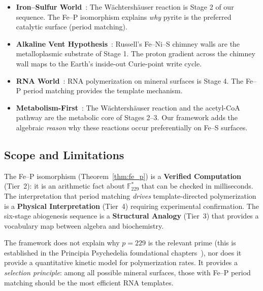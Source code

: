 \documentclass[12pt]{article}
\theoremstyle{principia}
\theoremstyle{definition}
\theoremstyle{remark}
\providecommand{\FF}{\mathbb{F}}
\begin{document}
\begin{itemize}[noitemsep]
    \item \textbf{Iron--Sulfur World}~\cite{Wachtershauser88}: The W\"achtersh\"auser reaction is Stage 2 of our sequence. The Fe--P isomorphism explains \emph{why} pyrite is the preferred catalytic surface (period matching).
    \item \textbf{Alkaline Vent Hypothesis}~\cite{Russell97, Martin03, Lane10}: Russell's Fe--Ni--S chimney walls are the metalloplasmic substrate of Stage 1. The proton gradient across the chimney wall maps to the Earth's inside-out Curie-point write cycle.
    \item \textbf{RNA World}~\cite{Gilbert86}: RNA polymerization on mineral surfaces is Stage 4. The Fe--P period matching provides the template mechanism.
    \item \textbf{Metabolism-First}~\cite{Morowitz92}: The W\"achtersh\"auser reaction and the acetyl-CoA pathway are the metabolic core of Stages 2--3. Our framework adds the algebraic \emph{reason} why these reactions occur preferentially on Fe--S surfaces.
\end{itemize}

\subsection{Scope and Limitations}

The Fe--P isomorphism (Theorem~\ref{thm:fe_p}) is a \textbf{Verified Computation} (Tier~2): it is an arithmetic fact about $\FF_{229}^*$ that can be checked in milliseconds. The interpretation that period matching \emph{drives} template-directed polymerization is a \textbf{Physical Interpretation} (Tier~4) requiring experimental confirmation. The six-stage abiogenesis sequence is a \textbf{Structural Analogy} (Tier~3) that provides a vocabulary map between algebra and biochemistry.

The framework does not explain why $p = 229$ is the relevant prime (this is established in the Principia Psychedelia foundational chapters~\cite{LaRue_PP}), nor does it provide a quantitative kinetic model for polymerization rates. It provides a \emph{selection principle}: among all possible mineral surfaces, those with Fe--P period matching should be the most efficient RNA templates.



\end{document}
